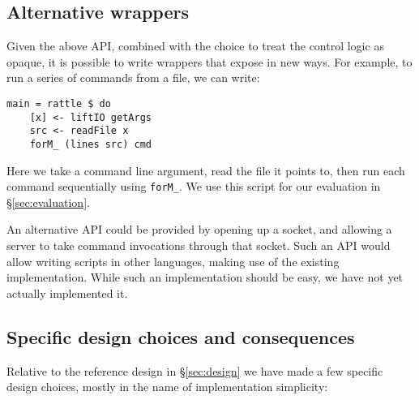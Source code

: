 \subsection{Alternative \Rattle wrappers}

Given the above API, combined with the choice to treat the control logic as opaque, it is possible to write wrappers that expose \Rattle in new ways. For example, to run a series of commands from a file, we can write:

\vspace{3mm}
\begin{small}
\begin{verbatim}
main = rattle $ do
    [x] <- liftIO getArgs
    src <- readFile x
    forM_ (lines src) cmd
\end{verbatim}
\end{small}
\vspace{3mm}

Here we take a command line argument, read the file it points to, then run each command sequentially using \texttt{forM\_}. We use this script for our evaluation in \S\ref{sec:evaluation}.

An alternative API could be provided by opening up a socket, and allowing a \Rattle server to take command invocations through that socket. Such an API would allow writing \Rattle scripts in other languages, making use of the existing \Rattle implementation. While such an implementation should be easy, we have not yet actually implemented it.

\subsection{Specific design choices and consequences}
\label{sec:choices}

Relative to the reference design in \S\ref{sec:design} we have made a few specific design choices, mostly in the name of implementation simplicity:

